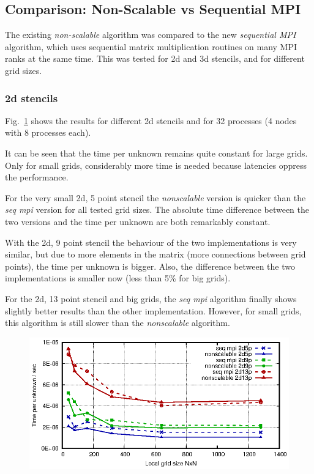 \subsection{Comparison: Non-Scalable vs Sequential MPI}
The existing \textit{non-scalable} algorithm was compared to the new \textit{sequential MPI} algorithm, which uses sequential matrix multiplication routines on many MPI ranks at the same time. This was tested for 2d and 3d stencils, and for different grid sizes.

\subsubsection*{2d stencils}
Fig.~\ref{fig:mat_ex_test_ex2_times_2d} shows the results for different 2d stencils and for 32 processes (4 nodes with 8 processes each). 

It can be seen that the time per unknown remains quite constant for large grids. Only for small grids, considerably more time is needed because latencies oppress the performance.


For the very small 2d, 5 point stencil the \textit{nonscalable} version is quicker than the \textit{seq mpi} version for all tested grid sizes. The absolute time difference between the two versions and the time per unknown are both remarkably constant. 

With the 2d, 9 point stencil the behaviour of the two implementations is very similar, but due to more elements in the matrix (more connections between grid points), the time per unknown is bigger. Also, the difference between the two implementations is smaller now (less than 5\% for big grids). 

For the 2d, 13 point stencil and big grids, the \textit{seq mpi} algorithm finally shows slightly better results than the other implementation. However, for small grids, this algorithm is still slower than the \textit{nonscalable} algorithm. 

\begin{figure}[tbp]
	\centering
	\includegraphics[width=1\textwidth]{times_2d}
	\caption{} 
	\label{fig:mat_ex_test_ex2_times_2d}
\end{figure}

